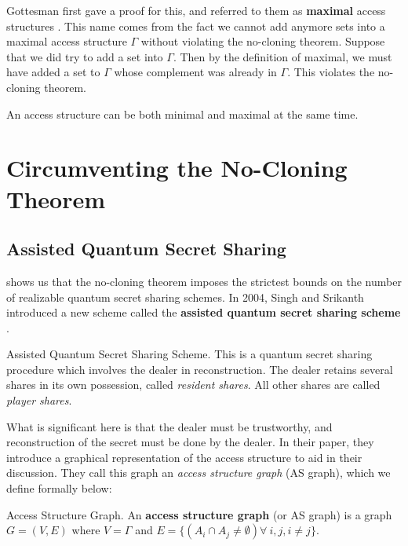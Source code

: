 Gottesman first gave a proof for this, and referred to them as \textbf{maximal} access structures \cite{gottesman_theory_2000}. This name comes from the fact we cannot add anymore sets into a maximal access structure $\Gamma$ without violating the no-cloning theorem. Suppose that we did try to add a set into $\Gamma$. Then by the definition of maximal, we must have added a set to $\Gamma$ whose complement was already in $\Gamma$. This violates the no-cloning theorem.

\begin{remark}
    An access structure can be both minimal and maximal at the same time.
\end{remark}

\section{Circumventing the No-Cloning Theorem}

\subsection{Assisted Quantum Secret Sharing}
\label{ssec:aqss}

 shows us that the no-cloning theorem imposes the strictest bounds on the number of realizable quantum secret sharing schemes. In 2004, Singh and Srikanth introduced a new scheme called the \textbf{assisted quantum secret sharing scheme} \cite{singh_assisted_2004}. 

\begin{definition}{Assisted Quantum Secret Sharing Scheme.}
    \label{defn:aqss}
    This is a quantum secret sharing procedure which involves the dealer in reconstruction. The dealer retains several shares in its own possession, called \textit{resident shares}. All other shares are called \textit{player shares}.
\end{definition}

What is significant here is that the dealer must be trustworthy, and reconstruction of the secret must be done by the dealer. In their paper, they introduce a graphical representation of the access structure to aid in their discussion. They call this graph an \textit{access structure graph} (AS graph), which we define formally below:

\begin{definition}{Access Structure Graph.}
    \label{defn:access-structure-graph}
    An \textbf{access structure graph} (or AS graph) is a graph $G = (V,E)$ where $V = \Gamma$ and $E = \{(A_i \cap A_j \neq \emptyset) \forall\:i,j,i\neq j\}$.
\end{definition}

